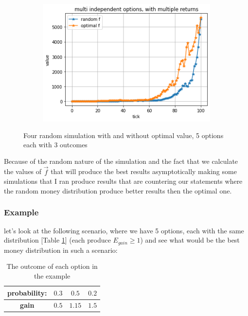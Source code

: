 \documentclass{article}
\begin{document}
\begin{figure}[!h]
\begin{subfigure}{0.525\textwidth}
	\end{subfigure}
	\begin{subfigure}{0.525\textwidth}
		\includegraphics[width=0.9\linewidth]{multi2-4}
	\end{subfigure}
	\caption{Four random simulation with and without optimal value, 5 options each with 3 outcomes}
	\label{Fig:multi2}
\end{figure}
	Because of the random nature of the simulation and the fact that we calculate  the values of $\overrightarrow{f}$ that will produce the best results asymptotically making some simulations that I ran produce results that are countering our statements where the random money distribution produce better results then the optimal one.
	\newpage
	\subsubsection{Example}
	let's look at the following scenario, where we have 5 options, each with the same distribution [Table \ref{prob}] (each produce $E_{gain} \ge 1$) and see what would be the best money distribution in such a scenario:\newline
	
	\begin{table}[!h]
		\centering\begin{tabular}{|c||c|c|c|}
			\hline
			\textbf{probability:} & $0.3$ & $0.5$ & $0.2$ \\ 
			\hline
			 \textbf{gain} & $0.5$ & $1.15$ & $1.5$  \\
			 \hline
		\end{tabular}
	\caption{The outcome of each option in the example}
	\label{prob}
	\end{table}
	
\end{document}
